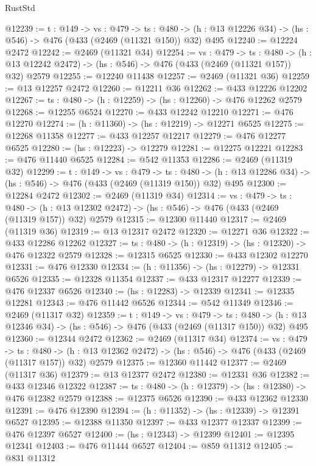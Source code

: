 \begin{lexlean}{RustStd}
\begin{coremodule}
@12239 := {t : @149} ->
  {vs : @479} ->
  {ts : @480} -> (h : @13 @12226 @34) -> (hs : @546) -> @476 (@433 (@2469 (@11321 @150)) @32) @495
@12240 := @12224 @2472
@12242 := @2469 (@11321 @34)
@12254 := {vs : @479} ->
  {ts : @480} ->
  (h : @13 @12242 @2472) -> (hs : @546) -> @476 (@433 (@2469 (@11321 @157)) @32) @2579
@12255 := @12240 @11438
@12257 := @2469 (@11321 @36)
@12259 := @13 @12257 @2472
@12260 := @12211 @36
@12262 := @433 @12226 @12202
@12267 := {ts : @480} -> (h : @12259) -> (hs : @12260) -> @476 @12262 @2579
@12268 := @12255 @6524
@12270 := @433 @12242 @12210
@12271 := @476 @12270
@12274 := (h : @11360) -> (hs : @12219) -> @12271 @6525
@12275 := @12268 @11358
@12277 := @433 @12257 @12217
@12279 := @476 @12277 @6525
@12280 := (hs : @12223) -> @12279
@12281 := @12275 @12221
@12283 := @476 @11440 @6525
@12284 := @542 @11353
@12286 := @2469 (@11319 @32)
@12299 := {t : @149} ->
  {vs : @479} ->
  {ts : @480} -> (h : @13 @12286 @34) -> (hs : @546) -> @476 (@433 (@2469 (@11319 @150)) @32) @495
@12300 := @12284 @2472
@12302 := @2469 (@11319 @34)
@12314 := {vs : @479} ->
  {ts : @480} ->
  (h : @13 @12302 @2472) -> (hs : @546) -> @476 (@433 (@2469 (@11319 @157)) @32) @2579
@12315 := @12300 @11440
@12317 := @2469 (@11319 @36)
@12319 := @13 @12317 @2472
@12320 := @12271 @36
@12322 := @433 @12286 @12262
@12327 := {ts : @480} -> (h : @12319) -> (hs : @12320) -> @476 @12322 @2579
@12328 := @12315 @6525
@12330 := @433 @12302 @12270
@12331 := @476 @12330
@12334 := (h : @11356) -> (hs : @12279) -> @12331 @6526
@12335 := @12328 @11354
@12337 := @433 @12317 @12277
@12339 := @476 @12337 @6526
@12340 := (hs : @12283) -> @12339
@12341 := @12335 @12281
@12343 := @476 @11442 @6526
@12344 := @542 @11349
@12346 := @2469 (@11317 @32)
@12359 := {t : @149} ->
  {vs : @479} ->
  {ts : @480} -> (h : @13 @12346 @34) -> (hs : @546) -> @476 (@433 (@2469 (@11317 @150)) @32) @495
@12360 := @12344 @2472
@12362 := @2469 (@11317 @34)
@12374 := {vs : @479} ->
  {ts : @480} ->
  (h : @13 @12362 @2472) -> (hs : @546) -> @476 (@433 (@2469 (@11317 @157)) @32) @2579
@12375 := @12360 @11442
@12377 := @2469 (@11317 @36)
@12379 := @13 @12377 @2472
@12380 := @12331 @36
@12382 := @433 @12346 @12322
@12387 := {ts : @480} -> (h : @12379) -> (hs : @12380) -> @476 @12382 @2579
@12388 := @12375 @6526
@12390 := @433 @12362 @12330
@12391 := @476 @12390
@12394 := (h : @11352) -> (hs : @12339) -> @12391 @6527
@12395 := @12388 @11350
@12397 := @433 @12377 @12337
@12399 := @476 @12397 @6527
@12400 := (hs : @12343) -> @12399
@12401 := @12395 @12341
@12403 := @476 @11444 @6527
@12404 := @859 @11312
@12405 := @831 @11312

\end{coremodule}
\end{lexlean}
